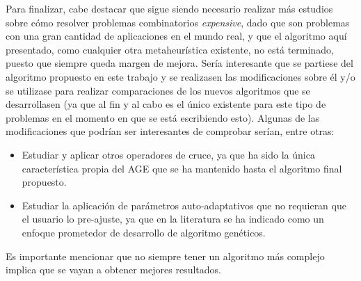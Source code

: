 Para finalizar, cabe destacar que sigue siendo necesario realizar más estudios sobre cómo resolver problemas combinatorios \textit{expensive}, dado que son problemas con una gran cantidad de aplicaciones en el mundo real, y que el algoritmo aquí presentado, como cualquier otra metaheurística existente, no está terminado, puesto que siempre queda margen de mejora. 
Sería interesante que se partiese del algoritmo propuesto en este trabajo y se realizasen las modificaciones sobre él y/o se utilizase para realizar comparaciones de los nuevos algoritmos que se desarrollasen (ya que al fin y al cabo es el único existente para este tipo de problemas en el momento en que se está escribiendo esto). 
Algunas de las modificaciones que podrían ser interesantes de comprobar serían, entre otras:
\begin{itemize}
	\item Estudiar y aplicar otros operadores de cruce, ya que ha sido la única característica propia del AGE que se ha mantenido hasta el algoritmo final propuesto. 
	\item Estudiar la aplicación de parámetros auto-adaptativos que no requieran que el usuario lo pre-ajuste, ya que en la literatura se ha indicado como un enfoque prometedor de desarrollo de algoritmo genéticos. 
\end{itemize}
Es importante mencionar que no siempre tener un algoritmo más complejo implica que se vayan a obtener mejores resultados.